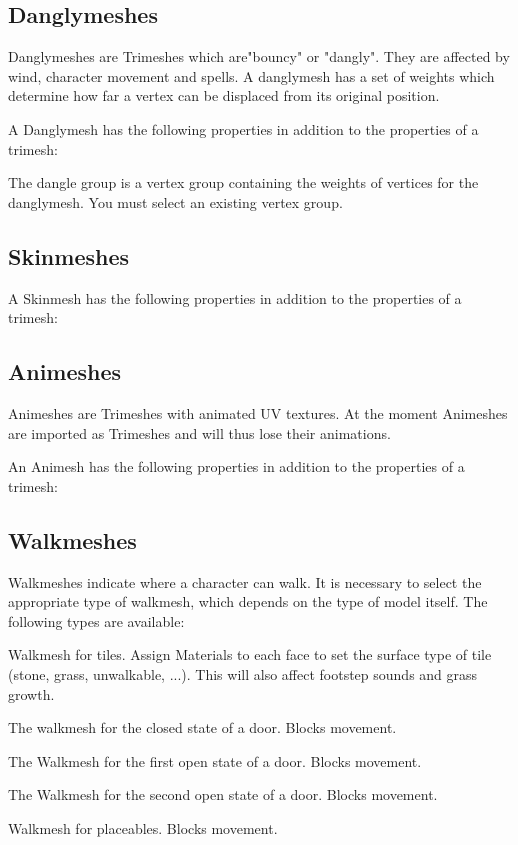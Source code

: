 \subsection{Danglymeshes}
Danglymeshes are Trimeshes which are"bouncy" or "dangly". They are affected by
wind, character movement and spells. A danglymesh has a set of weights which
determine how far a vertex can be displaced from its original position.

A Danglymesh has the following properties in addition to the properties of a 
trimesh:
\begin{description}[leftmargin=6em,style=nextline]
    \item[Dangle group] The dangle group is a vertex group containing the weights of vertices for the danglymesh. You must select an existing vertex group.
    \item[Period]
    \item[Tightness]
    \item[Displacement]
\end{description}

\subsection{Skinmeshes}
A Skinmesh has the following properties in addition to the properties of a 
trimesh:

\subsection{Animeshes}
Animeshes are Trimeshes with animated UV textures. At the moment Animeshes
are imported as Trimeshes and will thus lose their animations.

An Animesh has the following properties in addition to the properties of a 
trimesh:

\subsection{Walkmeshes}
Walkmeshes indicate where a character can walk. It is necessary to select 
the appropriate type of walkmesh, which depends on the type of model itself. 
The following types are available:
\begin{description}[leftmargin=6em,style=nextline]
    \item[Tileset] Walkmesh for tiles. Assign Materials to each face to set the
                   surface type of tile (stone, grass, unwalkable, ...).
                   This will also affect footstep sounds and grass growth.
    \item[Door: Closed] The walkmesh for the closed state of a door. Blocks movement.
    \item[Door: Open 1] The Walkmesh for the first open state of a door. Blocks movement.
    \item[Door: Open 2] The Walkmesh for the second open state of a door. Blocks movement.
    \item[Placeable] Walkmesh for placeables. Blocks movement.
\end{description}

